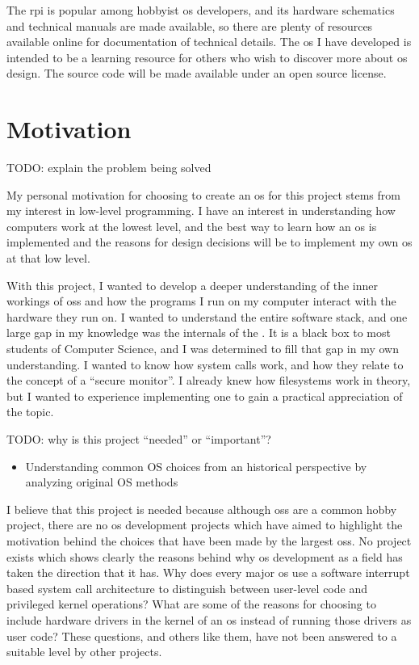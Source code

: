 \documentclass{article}
\begin{document}
The \gls{rpi} is popular among hobbyist \gls{os} developers, and its hardware
schematics and technical manuals are made available, so there are plenty of
resources available online for documentation of technical details. The \gls{os}
I have developed is intended to be a learning resource for others who wish to
discover more about \gls{os} design. The source code will be made available
under an open source license.

\section{Motivation}

TODO: explain the problem being solved

My personal motivation for choosing to create an \gls{os} for this project
stems from my interest in low-level programming. I have an interest in
understanding how computers work at the lowest level, and the best way to learn
how an \gls{os} is implemented and the reasons for design decisions will be to
implement my own \gls{os} at that low level.

With this project, I wanted to develop a deeper understanding of the inner
workings of \glspl{os} and how the programs I run on my computer interact with
the hardware they run on. I wanted to understand the entire software stack, and
one large gap in my knowledge was the internals of the . It is a
black box to most students of Computer Science, and I was determined to fill
that gap in my own understanding. I wanted to know how system calls work, and
how they relate to the concept of a ``secure monitor''. I already knew how
filesystems work in theory, but I wanted to experience implementing one to gain
a practical appreciation of the topic.

TODO: why is this project ``needed'' or ``important''?
\begin{itemize}
    \item Understanding common OS choices from an historical perspective by
        analyzing original OS methods
\end{itemize}

I believe that this project is needed because although \glspl{os} are a common
hobby project, there are no \gls{os} development projects which have aimed to
highlight the motivation behind the choices that have been made by the largest
\glspl{os}. No project exists which shows clearly the reasons behind why
\gls{os} development as a field has taken the direction that it has. Why does
every major \gls{os} use a software interrupt based system call architecture to
distinguish between user-level code and privileged kernel operations? What are
some of the reasons for choosing to include hardware drivers in the kernel of
an \gls{os} instead of running those drivers as user code? These questions, and
others like them, have not been answered to a suitable level by other projects.
\end{document}
